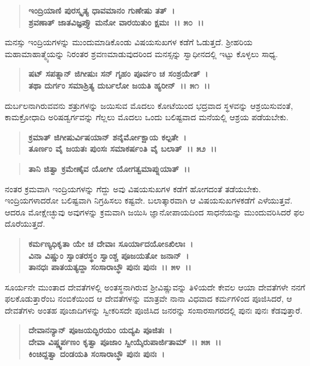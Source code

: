 \begin{verse}
\textbf{ಇಂದ್ರಿಯಾಣಿ ಪುರಸ್ಕೃತ್ಯ ಧಾವಮಾನಂ ಗುಣೇಷು ತತ್~।}\\\textbf{ಶ್ರವಣಾತ್ ಜಾತವಿಜ್ಞಪ್ತ್ಯೌ ಮನೋ ವಾರಯಿತುಂ ಕ್ಷಮಃ~।। ೫೦~।।}
\end{verse}

ಮನಸ್ಸು ಇಂದ್ರಿಯಗಳನ್ನು ಮುಂದುಮಾಡಿಕೊಂಡು ವಿಷಯಸುಖಗಳ ಕಡೆಗೆ ಓಡುತ್ತದೆ. ಶ‍್ರೀಹರಿಯ ಮಹಾಮಾಹಾತ್ಮ್ಯೆಯನ್ನು ನಿರಂತರ ಶ್ರವಣಮಾಡುವುದರಿಂದ ಮನಸ್ಸನ್ನು ಸ್ವಾಧೀನದಲ್ಲಿ ಇಟ್ಟು ಕೊಳ್ಳಲು ಸಾಧ್ಯ.

\begin{verse}
\textbf{ಷಟ್ ಸಪತ್ನಾನ್ ಜಿಗೀಷುಃ ಸನ್ ಗೃಹಂ ಪೂರ್ವಂ ಚ ಸಂಶ್ರಯೇತ್~।}\\\textbf{ತಥಾ ದುರ್ಗಂ ಸಮಾಶ್ರಿತ್ಯ ದುರ್ಬಲೋ ಜಯತಿ ಹ್ಯರೀನ್~।। ೫೧~।।}
\end{verse}

ದುರ್ಬಲನಾಗಿರುವವನು ಶತ್ರುಗಳನ್ನು ಜಯಿಸುವ ಮೊದಲು ಕೋಟೆಯಿಂದ ಭದ್ರವಾದ ಸ್ಥಳವನ್ನು ಆಶ್ರಯಿಸುವಂತೆ, ಕಾಮಕ್ರೋಧಾದಿ ಅರಿಷಡ್ವರ್ಗವನ್ನು ಗೆಲ್ಲಲು ಮೊದಲು ಒಂದು ಬಲಿಷ್ಟವಾದ ಮನೆಯಲ್ಲಿ ಆಶ್ರಯ ಪಡೆಯಬೇಕು.

\begin{verse}
\textbf{ಕ್ರಮಾತ್ ಜಿಗೀಷುರ್ವಿಷಯಾನ್ ಶನೈರ್ಮೋಕ್ಷಾಯ ಕಲ್ಪತೇ~।}\\\textbf{ತೂರ್ಣಂ ವೈ ಜಯತಃ ಪುಂಸಃ ಸಮಾಕರ್ಷಂತಿ ವೈ ಬಲಾತ್~।। ೫೨~।।} 
\end{verse}

\begin{verse}
\textbf{ತಾನಿ ಜಿತ್ವಾ ಕ್ರಮೇಣೈವ ಯೋಗೀ ಯೋಗತ್ವಮಾಪ್ನುಯಾತ್~।।}
\end{verse}

ನಂತರ ಕ್ರಮವಾಗಿ ಇಂದ್ರಿಯಗಳನ್ನು ಗೆದ್ದು ಅವು ವಿಷಯಸುಖಗಳ ಕಡೆಗೆ ಹೋಗದಂತೆ ತಡೆಯಬೇಕು. ಇಂದ್ರಿಯಗಳಾದರೋ ಬಲಿಷ್ಟವಾಗಿ ನಿಗ್ರಹಿಸಲು ಕಷ್ಟವೇ. ಬಲಾತ್ಕಾರವಾಗಿ ಆ ವಿಷಯಸುಖಗಳಕಡೆಗೆ ಎಳೆಯುತ್ತವೆ. ಆದರೂ ಮೋಕ್ಷೇಚ್ಛುವು ಅವುಗಳನ್ನು ಕ್ರಮವಾಗಿ ಜಯಿಸಿ ಜ್ಞಾನೋಪಾಯದಿಂದ ಸಾಧನೆಯನ್ನು ಮುಂದುವರಿಸಿದರೆ ಫಲ ದೊರೆಯುತ್ತದೆ.

\begin{verse}
\textbf{ಕರ್ಮಣ್ಯಧಿಕೃತಾ ಯೇ ಚ ದೇವಾಃ ಸೂರ್ಯಾದಯೋಽಖಿಲಾಃ~।}\\\textbf{ವಿನಾ ವಿಷ್ಣುಂ ಸ್ವಾಂತರಸ್ಥಂ ಸ್ವಾಂಶ್ಚ ಪೂಜಯತೋ ಜನಾನ್~। }\\\textbf{ತಾನಧಃ ಪಾತಯತ್ಯದ್ದಾ ಸಂಸಾರಾಬ್ಧೌ ಪುನಃ ಪುನಃ~।। ೫೪~।।}
\end{verse}

ಸೂರ್ಯನೇ ಮುಂತಾದ ದೇವತೆಗಳಲ್ಲಿ ಅಂತಸ್ಥನಾಗಿರುವ ಶ‍್ರೀವಿಷ್ಣುವನ್ನು ತಿಳಿಯದೇ ಕೇವಲ ಆಯಾ ದೇವತೆಗಳೇ ನನಗೆ ಫಲಕೊಡುತ್ತಾರೆಂಬ ನಂಬಿಕೆಯಿಂದ ಆ ದೇವತೆ\-ಗಳನ್ನು ಮಾತ್ರವೇ ನಾನಾ ವಿಧವಾದ ಕರ್ಮಗಳಿಂದ ಪೂಜಿಸಿದರೆ, ಆ ದೇವತೆಗಳು ಅಂತಹ ಪೂಜಾದಿಗಳನ್ನು ಸ್ವೀಕರಿಸದೇ ಪೂಜಿಸಿದ ಜನರನ್ನು ಸಂಸಾರಸಾಗರದಲ್ಲಿ ಪುನಃ ಪುನಃ ಕೆಡವುತ್ತಾರೆ.

\begin{verse}
\textbf{ದೇವಾನನ್ಯಾನ್ ಪೂಜಯದ್ಭಿರಯಂ ಯದ್ಯಪಿ ಪೂಜಿತಃ~।}\\\textbf{ದೇವಾ ವಿಷ್ಣ್ವರ್ಪಣಂ ಕೃತ್ವಾ ಪೂಜಾಂ ಸ್ವೀಯೈರುಪಾರ್ಜಿತಾಮ್~।। ೫೫~।।}\\\textbf{ಕಿಂಚಿದ್ದತ್ವಾ ದಂಡಯತಿ ಸಂಸಾರಾಬ್ಧೌ ಪುನಃ ಪುನಃ~।}
\end{verse}

